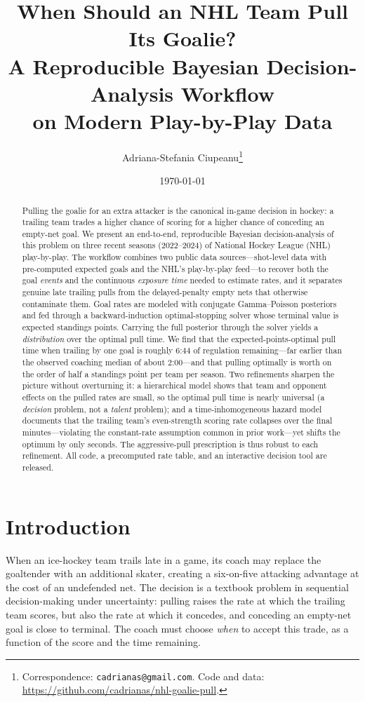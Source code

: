 \documentclass[11pt]{article}
\title{\textbf{When Should an NHL Team Pull Its Goalie?}\\[2pt]
\large A Reproducible Bayesian Decision-Analysis Workflow\\ on Modern Play-by-Play Data}
\author{Adriana-Stefania Ciupeanu\thanks{Correspondence: \texttt{cadrianas@gmail.com}.
Code and data: \url{https://github.com/cadrianas/nhl-goalie-pull}.}}
\date{\today}
\begin{document}
\maketitle

\begin{abstract}
\noindent
Pulling the goalie for an extra attacker is the canonical in-game decision in
hockey: a trailing team trades a higher chance of scoring for a higher chance of
conceding an empty-net goal. We present an end-to-end, reproducible Bayesian
decision-analysis of this problem on three recent seasons (2022--2024) of
National Hockey League (NHL) play-by-play. The
workflow combines two public data sources---shot-level data with pre-computed
expected goals and the NHL's play-by-play feed---to recover both the goal
\emph{events} and the continuous \emph{exposure time} needed to estimate rates,
and it separates genuine late trailing pulls from the delayed-penalty empty nets
that otherwise contaminate them. Goal rates are modeled with conjugate
Gamma--Poisson posteriors and fed through a backward-induction optimal-stopping
solver whose terminal value is expected standings points. Carrying the full
posterior through the solver yields a \emph{distribution} over the optimal pull
time. We find that the expected-points-optimal pull time when trailing by one
goal is roughly $6$:$44$ of regulation remaining---far earlier than the observed
coaching median of about $2$:$00$---and that pulling optimally is worth on the
order of half a standings point per team per season. Two refinements sharpen the
picture without overturning it: a hierarchical model shows that team and opponent
effects on the pulled rates are small, so the optimal pull time is nearly
universal (a \emph{decision} problem, not a \emph{talent} problem); and a
time-inhomogeneous hazard model documents that the trailing team's even-strength
scoring rate collapses over the final minutes---violating the constant-rate
assumption common in prior work---yet shifts the optimum by only seconds. The
aggressive-pull prescription is thus robust to each refinement. All code, a
precomputed rate table, and an interactive decision tool are released.
\end{abstract}

\section{Introduction}

When an ice-hockey team trails late in a game, its coach may replace the goaltender
with an additional skater, creating a six-on-five attacking advantage at the cost
of an undefended net. The decision is a textbook problem in sequential
decision-making under uncertainty: pulling raises the rate at which the trailing
team scores, but also the rate at which it concedes, and conceding an empty-net
goal is close to terminal. The coach must choose \emph{when} to accept this
trade, as a function of the score and the time remaining.
\end{document}
